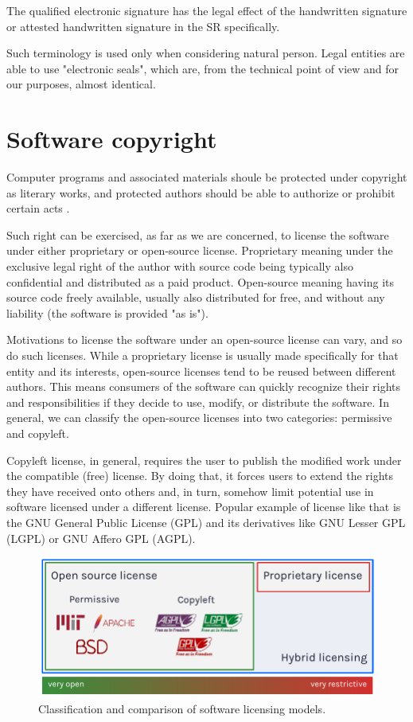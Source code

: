 \documentclass[a4paper,twocolumn]{article}
\begin{document}
The qualified electronic signature has the legal effect of the handwritten signature \cite{4} or attested handwritten signature in the SR specifically.

Such terminology is used only when considering natural person. Legal entities are able to use "electronic seals", which are, from the technical point of view and for our purposes, almost identical.

\section{Software copyright}

Computer programs and associated materials shoule be protected under copyright as literary works, and protected authors should be able to authorize or prohibit certain acts \cite{6}.

Such right can be exercised, as far as we are concerned, to license the software under either proprietary or open-source license.
Proprietary meaning under the exclusive legal right of the author with source code being typically also confidential and distributed as a paid product.
Open-source meaning having its source code freely available, usually also distributed for free, and without any liability (the software is provided "as is").

Motivations to license the software under an open-source license can vary, and so do such licenses.
While a proprietary license is usually made specifically for that entity and its interests, open-source licenses tend to be reused between different authors.
This means consumers of the software can quickly recognize their rights and responsibilities if they decide to use, modify, or distribute the software.
In general, we can classify the open-source licenses into two categories: permissive and copyleft.

Copyleft license, in general, requires the user to publish the modified work under the compatible (free) license.
By doing that, it forces users to extend the rights they have received onto others and, in turn, somehow limit potential use in software licensed under a different license.
Popular example of license like that is the GNU General Public License (GPL) and its derivatives like GNU Lesser GPL (LGPL) or GNU Affero GPL (AGPL).

\begin{figure}[ht!]
    \includegraphics[width=\linewidth]{../paper/figures/license-comparison}
    \caption{Classification and comparison of software licensing models.}
    \centering
\end{figure}
\end{document}
